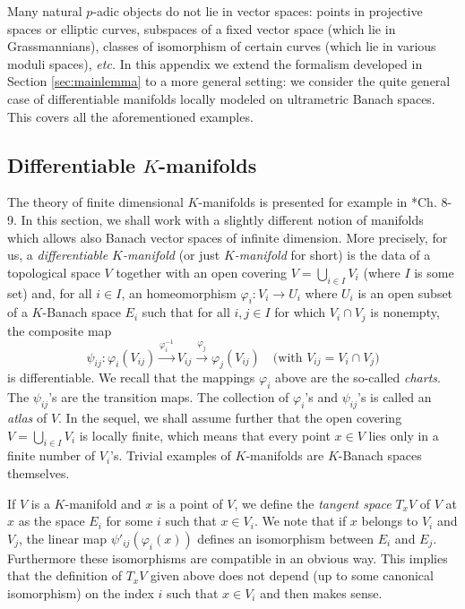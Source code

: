 \documentclass{lms}
\begin{document}
Many natural $p$-adic objects do not lie in vector spaces:
points in projective spaces or elliptic curves,
subspaces of a fixed vector space (which lie in Grassmannians),
classes of isomorphism of certain curves (which lie in various moduli spaces),
\emph{etc.}  In this appendix we extend the formalism 
developed in Section \ref{sec:mainlemma} to a more general setting:
we consider the quite general case of 
differentiable manifolds locally modeled on ultrametric Banach spaces.
This covers all the 
aforementioned examples.

\subsection{Differentiable $K$-manifolds}
\label{ssec:manifold}

The theory of finite dimensional $K$-manifolds is presented for example 
in \cite{schneider:11a}*{Ch. 8-9}. In this section, we shall work with
a slightly different notion of manifolds which allows also Banach vector 
spaces of infinite dimension.
More precisely, for us, a \emph{ differentiable $K$-manifold} 
(or just \emph{$K$-manifold} for short) is the data of a topological 
space $V$ together with an open covering $V = \bigcup_{i \in I} V_i$ 
(where $I$ is some set) and, for all $i \in I$, an homeomorphism 
$\varphi_i : V_i \to U_i$ where $U_i$ is an open subset of a $K$-Banach space
$E_i$ such that for all $i,j \in I$ for which $V_i \cap V_j$ is 
nonempty, the composite map
\begin{equation}
\label{eq:psiij}
\psi_{ij} : 
\varphi_i(V_{ij}) \stackrel{\varphi_i^{-1}}{\longrightarrow} 
V_{ij} \stackrel{\varphi_j}{\longrightarrow} \varphi_j(V_{ij})
\quad \text{(with } V_{ij} = V_i \cap V_j \text{)}
\end{equation}
is differentiable. We recall that
the mappings $\varphi_i$ above are the so-called \emph{charts}. The
$\psi_{ij}$'s are the transition maps. The collection of $\varphi_i$'s
and $\psi_{ij}$'s is called an \emph{atlas} of $V$. In the sequel, we 
shall assume further that the open covering $V = \bigcup_{i \in I} V_i$ 
is locally finite, which means that every point $x \in V$ lies only in a 
finite number of $V_i$'s. Trivial examples of $K$-manifolds are 
$K$-Banach spaces themselves.

If $V$ is a $K$-manifold and $x$ is a point of $V$, we define the 
\emph{tangent space} $T_x V$ of $V$ at $x$ as the space $E_i$ for some 
$i$ such that $x \in V_i$. We note that if $x$ belongs to $V_i$ and 
$V_j$, the linear map $\psi'_{ij}(\varphi_i(x))$ defines an isomorphism 
between $E_i$ and $E_j$. Furthermore these isomorphisms are compatible 
in an obvious way. This implies that the definition of $T_x V$ given 
above does not depend (up to some canonical isomorphism) on the index 
$i$ such that $x \in V_i$ and then makes sense.
\end{document}
